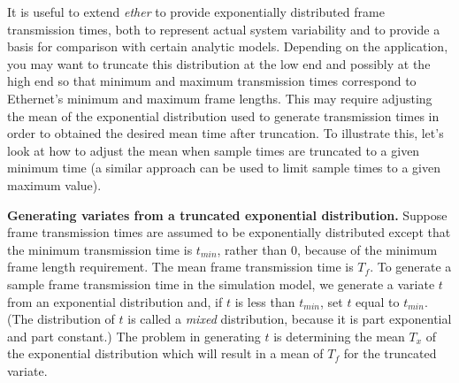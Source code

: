 It is useful to extend \emph{ether} to provide exponentially distributed frame transmission times, both to represent actual system variability and to provide a basis for comparison with certain analytic models. Depending on the application, you may want to truncate this distribution at the low end and possibly at the high end so that minimum and maximum transmission times correspond to Ethernet's minimum and maximum frame lengths. This may require adjusting the mean of the exponential distribution used to generate transmission times in order to obtained the desired mean time after truncation. To illustrate this, let's look at how to adjust the mean when sample times are truncated to a given minimum time (a similar approach can be used to limit sample times to a given maximum value).

\noindent\textbf{Generating variates from a truncated exponential distribution.} Suppose frame transmission times are assumed to be exponentially distributed except that the minimum transmission time is $t_{min}$, rather than 0, because of the minimum frame length requirement. The mean frame transmission time is $T_f$. To generate a sample frame transmission time in the simulation model, we generate a variate $t$ from an exponential distribution and, if $t$ is less than $t_{min}$, set $t$ equal to $t_{min}$. (The distribution of $t$ is called a \emph{mixed} distribution, because it is part exponential and part constant.) The problem in generating $t$ is determining the mean $T_x$ of the exponential distribution which will result in a mean of $T_f$ for the truncated variate.

